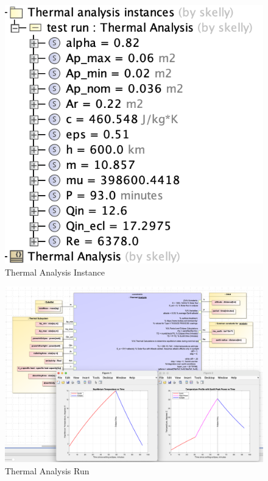 \begin{figure}[H]
    \centering
    \includegraphics[width=4 in]{Thesis/Analysis_and_Results/Analysis and Results Figures/Thermal Analysis Instances.png}
    \caption{Thermal Analysis Instance}
    \label{fig:Thermal Analysis Instances}
\end{figure}

\begin{figure}[H]
    \centering
    \includegraphics[scale=0.4, angle=90]{Thesis/Analysis_and_Results/Analysis and Results Figures/Thermal Analysis Run.png}
    \caption{Thermal Analysis Run}
    \label{fig:Thermal Analysis Completed}
\end{figure}

